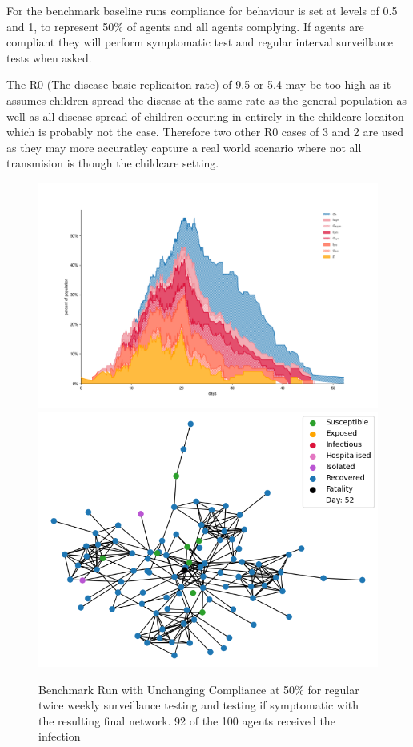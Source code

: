 \documentclass{article}
\begin{document}
For the benchmark baseline runs compliance for behaviour is set at levels of  0.5 and 1, to represent 50\% of agents and all agents complying. If agents are compliant they will perform symptomatic test and regular interval surveillance tests when asked.

The R0 (The disease basic replicaiton rate) of 9.5 or 5.4 may be too high as it assumes children spread the disease at the same rate as the general population as well as all disease spread of children occuring in entirely in the childcare locaiton which is probably not the case. Therefore two other R0 cases of 3 and 2 are used as they may more accuratley capture a real world scenario where not all transmision is though the childcare setting.

\begin{figure}
	\centering
	\includegraphics[width=\textwidth]{Figure3}
	\includegraphics[width=\textwidth]{Figure3Net}
	\caption{Benchmark Run with Unchanging Compliance at 50\% for regular twice weekly surveillance testing and testing if symptomatic with the resulting final network. 92 of the 100 agents received the infection}
\end{figure}
\end{document}
